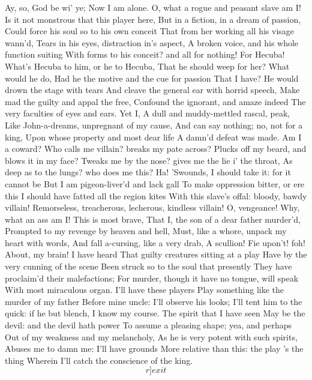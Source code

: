 \documentclass[11pt]{book}
\newcommand \Act   {\Nact{+1}\Nscene{0}}
\begin{document}
\1	Ay, so, God be wi' ye; Now I am alone.
	O, what a rogue and peasant slave am I!
	Is it not monstrous that this player here,
	But in a fiction, in a dream of passion,
	Could force his soul so to his own conceit
	That from her working all his visage wann'd,
	Tears in his eyes, distraction in's aspect,
	A broken voice, and his whole function suiting
	With forms to his conceit? and all for nothing!
	For Hecuba!
	What's Hecuba to him, or he to Hecuba,
	That he should weep for her? What would he do,
	Had he the motive and the cue for passion
	That I have? He would drown the stage with tears
	And cleave the general ear with horrid speech,
	Make mad the guilty and appal the free,
	Confound the ignorant, and amaze indeed
	The very faculties of eyes and ears. Yet I,
	A dull and muddy-mettled rascal, peak,
	Like John-a-dreams, unpregnant of my cause,
	And can say nothing; no, not for a king,
	Upon whose property and most dear life
	A damn'd defeat was made. Am I a coward?
	Who calls me villain? breaks my pate across?
	Plucks off my beard, and blows it in my face?
	Tweaks me by the nose? gives me the lie i' the throat,
	As deep as to the lungs? who does me this?
	Ha! 'Swounds, I should take it: for it cannot be
	But I am pigeon-liver'd and lack gall
	To make oppression bitter, or ere this
	I should have fatted all the region kites
	With this slave's offal: bloody, bawdy villain!
	Remorseless, treacherous, lecherous, kindless villain!
	O, vengeance!
	Why, what an ass am I! This is most brave,
	That I, the son of a dear father murder'd,
	Prompted to my revenge by heaven and hell,
	Must, like a whore, unpack my heart with words,
	And fall a-cursing, like a very drab,
	A scullion! Fie upon't! foh!
   About, my brain! I have heard
	That guilty creatures sitting at a play
	Have by the very cunning of the scene
	Been struck so to the soul that presently
	They have proclaim'd their malefactions;
	For murder, though it have no tongue, will speak
	With most miraculous organ. I'll have these players
	Play something like the murder of my father
	Before mine uncle: I'll observe his looks;
	I'll tent him to the quick: if he but blench,
	I know my course. The spirit that I have seen
	May be the devil: and the devil hath power
	To assume a pleasing shape; yea, and perhaps
	Out of my weakness and my melancholy,
	As he is very potent with such spirits,
	Abuses me to damn me: I'll have grounds
	More relative than this: the play 's the thing
	Wherein I'll catch the conscience of the king. \[r]exit\]


\Act %
\end{document}
